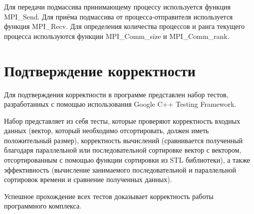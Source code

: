 \documentclass{report}
\begin{document}
\par Для передачи подмассива принимающему процессу используется функция MPI\_Send. Для приёма подмассива от процесса-отправителя используется функция MPI\_Recv. Для определения количества процессов и ранга текущего процесса используются функции MPI\_Comm\_size и MPI\_Comm\_rank.
\newpage

\section*{Подтверждение корректности}
Для подтверждения корректности в программе представлен набор тестов, разработанных с помощью использования Google C++ Testing Framework.
\par Набор представляет из себя тесты, которые проверяют корректность входных данных (вектор, который необходимо отсортировать, должен иметь положительный размер), корректность вычислений (сравнивается полученный благодаря параллельной или последовательной сортировке вектор с вектором, отсортированным с помощью функции сортировки из STL библиотеки), а также эффективность (вычисление занимаемого последовательной и параллельной сортировок времени и сравнение полученных данных).
\par Успешное прохождение всех тестов доказывает корректность работы программного комплекса.
\newpage

\end{document}
